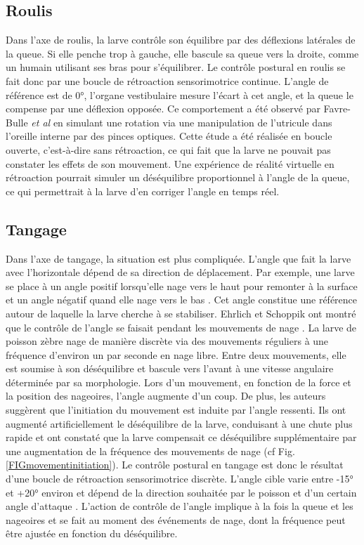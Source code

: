\subsection{Roulis}
Dans l'axe de roulis, la larve contrôle son équilibre par des déflexions latérales de la queue. Si elle penche trop à gauche, elle bascule sa queue vers la droite, comme un humain utilisant ses bras pour s'équilibrer. Le contrôle postural en roulis se fait donc par une boucle de rétroaction sensorimotrice continue. L'angle de référence est de 0°, l'organe vestibulaire mesure l'écart à cet angle, et la queue le compense par une déflexion opposée. Ce comportement a été observé par Favre-Bulle \emph{et al} \cite{favre-bulle_optical_2017} en simulant une rotation via une manipulation de l'utricule dans l'oreille interne par des pinces optiques. Cette étude a été réalisée en boucle ouverte, c'est-à-dire sans rétroaction, ce qui fait que la larve ne pouvait pas constater les effets de son mouvement. Une expérience de réalité virtuelle en rétroaction pourrait simuler un déséquilibre proportionnel à l'angle de la queue, ce qui permettrait à la larve d'en corriger l'angle en temps réel.

\subsection{Tangage}
Dans l'axe de tangage, la situation est plus compliquée. L'angle que fait la larve avec l'horizontale dépend de sa direction de déplacement. Par exemple, une larve se place à un angle positif lorsqu'elle nage vers le haut pour remonter à la surface et un angle négatif quand elle nage vers le bas \cite{ehrlich_primal_2019}. Cet angle constitue une référence autour de laquelle la larve cherche à se stabiliser. Ehrlich et Schoppik ont montré que le contrôle de l'angle se faisait pendant les mouvements de nage \cite{ehrlich_control_2017}. La larve de poisson zèbre nage de manière discrète via des mouvements réguliers à une fréquence d'environ un par seconde en nage libre. Entre deux mouvements, elle est soumise à son déséquilibre et bascule vers l'avant à une vitesse angulaire déterminée par sa morphologie. Lors d'un mouvement, en fonction de la force et la position des nageoires, l'angle augmente d'un coup. De plus, les auteurs suggèrent que l'initiation du mouvement est induite par l'angle ressenti. Ils ont augmenté artificiellement le déséquilibre de la larve, conduisant à une chute plus rapide et ont constaté que la larve compensait ce déséquilibre supplémentaire par une augmentation de la fréquence des mouvements de nage (cf Fig. \ref{FIGmovementinitiation}).
Le contrôle postural en tangage est donc le résultat d'une boucle de rétroaction sensorimotrice discrète. L'angle cible varie entre -15° et +20° environ et dépend de la direction souhaitée par le poisson et d'un certain angle d'attaque \cite{ehrlich_primal_2019}. L'action de contrôle de l'angle implique à la fois la queue et les nageoires et se fait au moment des événements de nage, dont la fréquence peut être ajustée en fonction du déséquilibre.

